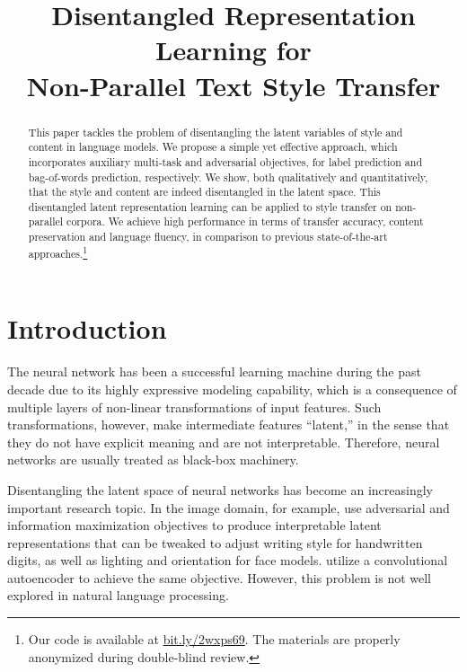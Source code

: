 \documentclass[11pt,a4paper]{article}
\title{Disentangled Representation Learning for\\Non-Parallel Text Style Transfer}
\date{}
\begin{document}
\maketitle
\graphicspath{{images/}}

\begin{abstract}
	This paper tackles the problem of disentangling the latent variables of style and content in language models. We propose a simple yet effective approach, which incorporates auxiliary multi-task and adversarial objectives, for label prediction and bag-of-words prediction, respectively. We show, both qualitatively and quantitatively, that the style and content are indeed disentangled in the latent space. This disentangled latent representation learning can be applied to style transfer on non-parallel corpora. We achieve high performance in terms of transfer accuracy, content preservation and language fluency, in comparison to previous state-of-the-art approaches.\footnote{Our code is available at \url{bit.ly/2wxps69}. The materials are properly anonymized during double-blind review.}
\end{abstract}

% 


\section{Introduction}

The neural network has been a successful learning machine during the past decade due to its highly expressive modeling capability, which is a consequence of multiple layers of non-linear transformations of input features.
Such transformations, however, make intermediate features ``latent,'' in the sense that they do not have explicit meaning and are not interpretable.
Therefore, neural networks are usually treated as black-box machinery.

Disentangling the latent space of neural networks has become an increasingly important research topic.
In the image domain, for example, \citet{chen2016infogan} use adversarial and information maximization objectives to produce interpretable latent representations that can be tweaked to adjust writing style for handwritten digits, as well as lighting and orientation for face models.
\citet{mathieu2016disentangling} utilize a convolutional autoencoder to achieve the same objective.
However, this problem is not well explored in natural language processing.
\end{document}
